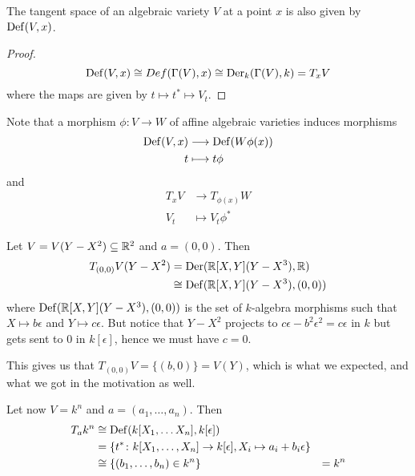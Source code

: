 \begin{proposition}
The tangent space of an algebraic variety $V$ at a point $x$ is also given by $\operatorname{Def}(V, x)$.
\end{proposition}
\begin{proof}
\begin{equation*}
    \operatorname{Def}(V, x)\cong Def(\Gamma(V), x)\cong \operatorname{Der}_k(\Gamma(V), k) = T_x V
\end{equation*}
where the maps are given by $t\longmapsto t^*\longmapsto V_t$. 
\end{proof}

Note that a morphism $\phi\colon V\longrightarrow W$ of affine algebraic varieties induces morphisms
\begin{align*}
    \operatorname{Def}(V, x)&\longrightarrow \operatorname{Def}(W \phi(x)) \\
    t&\longmapsto t\phi
\end{align*}
and 
\begin{align*}
    T_x V&\longrightarrow T_{\phi(x)} W \\
    V_t&\longmapsto V_t \phi^*
\end{align*}

\begin{example}
Let $V=V(Y-X^2)\subseteq \mathbb{R}^2$ and $a=(0,0)$. Then
\begin{align*}
    T_{(0,0)}V(Y-X^2) 
    &= \operatorname{Der}(\mathbb{R}[X,Y](Y-X^3), \mathbb{R}) \\
    &\cong \operatorname{Def}(\mathbb{R}[X,Y](Y-X^3), (0,0))
\end{align*}
where $\operatorname{Def}(\mathbb{R}[X,Y](Y-X^3), (0,0))$ is the set of $k$-algebra morphisms such that $X\longmapsto b\epsilon$ and $Y\longmapsto c\epsilon$. But notice that $Y-X^2$ projects to $c\epsilon - b^2\epsilon^2 = c\epsilon$ in $k$ but gets sent to $0$ in $k[\epsilon]$, hence we must have $c = 0$. 

This gives us that $T_{(0,0)} V = \{(b,0)\} = V(Y)$, which is what we expected, and what we got in the motivation as well. 
\end{example}

\begin{example}
Let now $V=k^n$ and $a=(a_1, \ldots, a_n)$. Then 
\begin{align*}
    T_a k^n 
    &\cong \operatorname{Def}(k[X_1, \ldots X_n], k[\epsilon]) \\
    &= \{ t^*\colon k[X_1, \ldots, X_n]\to k[\epsilon], X_i\mapsto a_i + b_i\epsilon \} \\
    &\cong \{ (b_1, \ldots, b_n)\in k^n \}
    &= k^n
\end{align*}
\end{example}

